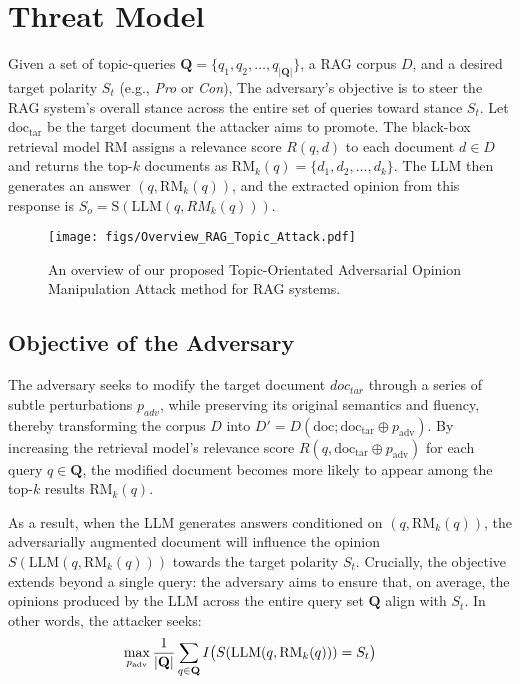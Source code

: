 \section{Threat Model}
\label{sec:threat_model}
Given a set of topic-queries $\mathbf{Q} = \{q_1, q_2, \ldots, q_{|\mathbf{Q}|}\}$, a RAG corpus $D$, and a desired target polarity $S_t$ (e.g., \textit{Pro} or \textit{Con}), The adversary's objective is to steer the RAG system's overall stance across the entire set of queries toward stance $S_t$. Let $\text{doc}_{\text{tar}}$ be the target document the attacker aims to promote. The black-box retrieval model $\text{RM}$ assigns a relevance score $R(q, d)$ to each document $d \in D$ and returns the top-$k$ documents as $\text{RM}_k(q)=\{d_1, d_2, \ldots, d_k\}$. The LLM then generates an answer $(q, \text{RM}_k(q))$, and the extracted opinion from this response is $S_o = \text{S}(\text{LLM}(q, RM_k(q)))$.


\begin{figure*}[!t]
  \centering
  \texttt{[image: figs/Overview\_RAG\_Topic\_Attack.pdf]}
  \caption{An overview of our proposed Topic-Orientated Adversarial Opinion Manipulation Attack method for RAG systems.}
  \label{overview}
\end{figure*}


\subsection{\textbf{Objective of the Adversary}}
The adversary seeks to modify the target document $doc_{tar}$ through a series of subtle perturbations $p_{adv}$, while preserving its original semantics and fluency, thereby transforming the corpus $D$ into $D' = D(\text{doc}; \text{doc}_{\text{tar}} \oplus p_{\text{adv}})$. By increasing the retrieval model’s relevance score $R(q, \text{doc}_{\text{tar}} \oplus p_{\text{adv}})$ for each query $q \in \mathbf{Q}$, the modified document becomes more likely to appear among the top-$k$ results $\text{RM}_k(q)$.

As a result, when the LLM generates answers conditioned on $(q, \text{RM}_k(q))$, the adversarially augmented document will influence the opinion $S(\text{LLM}(q, \text{RM}_k(q)))$ towards the target polarity $S_t$. Crucially, the objective extends beyond a single query: the adversary aims to ensure that, on average, the opinions produced by the LLM across the entire query set $\mathbf{Q}$ align with $S_t$. In other words, the attacker seeks:
\begin{align*}
    \max_{p_{\text{adv}}} \frac{1}{|\mathbf{Q}|}\sum_{q \in \mathbf{Q}} I\bigl(S(\text{LLM}(q, \text{RM}_k(q))) = S_t\bigr) \hspace{5mm}
\end{align*}


